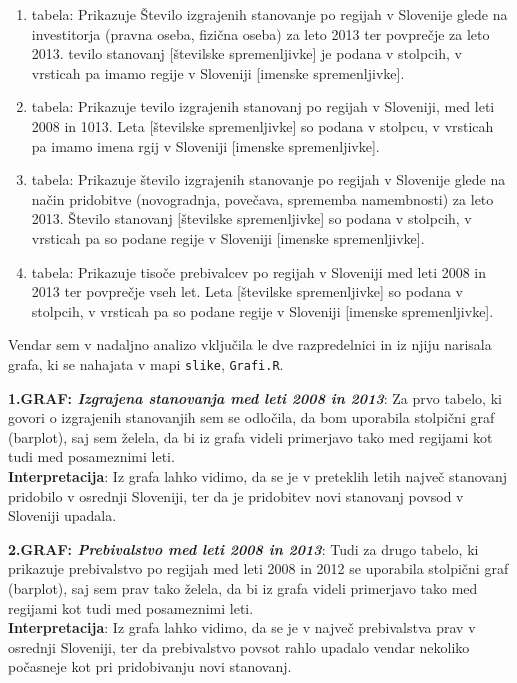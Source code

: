 \documentclass[11pt,a4paper]{article}
\begin{document}
\begin{enumerate}
\item{tabela: Prikazuje Število izgrajenih stanovanje po regijah v Slovenije glede na investitorja (pravna oseba, fizična oseba) za leto 2013 ter povprečje za leto 2013. tevilo stanovanj [številske spremenljivke] je podana v stolpcih, v vrsticah pa imamo regije v Sloveniji [imenske spremenljivke].}
\item{tabela: Prikazuje tevilo izgrajenih stanovanj po regijah v Sloveniji, med leti 2008 in 1013. Leta [številske spremenljivke] so podana v stolpcu, v vrsticah pa imamo imena rgij v Sloveniji [imenske spremenljivke].}
\item{tabela: Prikazuje število izgrajenih stanovanje po regijah v Slovenije glede na način pridobitve (novogradnja, povečava, sprememba namembnosti) za leto 2013. Število stanovanj [številske spremenljivke] so podana v stolpcih, v vrsticah pa so podane regije v Sloveniji [imenske spremenljivke].}
\item{tabela: Prikazuje tisoče prebivalcev po regijah v Sloveniji med leti 2008 in 2013 ter povprečje vseh let. Leta [številske spremenljivke] so podana v stolpcih, v vrsticah pa so podane regije v Sloveniji [imenske spremenljivke].}
\end{enumerate}

Vendar sem v nadaljno analizo vključila le dve razpredelnici in iz njiju narisala grafa, ki se nahajata v mapi \verb|slike|, \verb|Grafi.R|.

\newpage
\textbf{1.GRAF: \emph{Izgrajena stanovanja med leti 2008 in 2013}}: Za prvo tabelo, ki govori o izgrajenih stanovanjih sem se odločila, da bom uporabila stolpični graf (barplot), saj sem želela, da bi iz grafa videli primerjavo tako med regijami kot tudi med posameznimi leti.\\
\textbf{Interpretacija}: Iz grafa lahko vidimo, da se je v preteklih letih največ stanovanj pridobilo v osrednji Sloveniji, ter da je pridobitev novi stanovanj povsod v Sloveniji upadala.

\makebox[\textwidth][c]{

}

\newpage
\textbf{2.GRAF: \emph{Prebivalstvo med leti 2008 in 2013}}: Tudi za drugo tabelo, ki prikazuje prebivalstvo po regijah med leti 2008 in 2012 se uporabila stolpični graf (barplot), saj sem prav tako želela, da bi iz grafa videli primerjavo tako med regijami kot tudi med posameznimi leti.\\
\textbf{Interpretacija}: Iz grafa lahko vidimo, da se je v največ prebivalstva prav v osrednji Sloveniji, ter da prebivalstvo povsot rahlo upadalo vendar nekoliko počasneje kot pri pridobivanju novi stanovanj.
\end{document}
